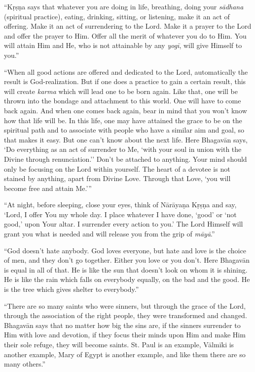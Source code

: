 \documentclass[12pt, twoside, openright]{memoir}
\begin{document}
\enquote{Kṛṣṇa says that whatever you are doing in life, breathing, doing your \textit{sādhana} (spiritual practice), eating, drinking, sitting, or listening, make it an act of offering. Make it an act of surrendering to the Lord. Make it a prayer to the Lord and offer the prayer to Him. Offer all the merit of whatever you do to Him. You will attain Him and He, who is not attainable by any \textit{yogī}, will give Himself to you.}

\enquote{When all good actions are offered and dedicated to the Lord, automatically the result is God-realization. But if one does a practice to gain a certain result, this will create \textit{karma} which will lead one to be born again. Like that, one will be thrown into the bondage and attachment to this world. One will have to come back again. And when one comes back again, bear in mind that you won’t know how that life will be. In this life, one may have attained the grace to be on the spiritual path and to associate with people who have a similar aim and goal, so that makes it easy. But one can’t know about the next life. Here Bhagavān says, \enquote{Do everything as an act of surrender to Me, ‘with your soul in union with the Divine through renunciation.’} Don’t be attached to anything. Your mind should only be focusing on the Lord within yourself. The heart of a devotee is not stained by anything, apart from Divine Love. Through that Love, \enquote{you will become free and attain Me.}}

\enquote{At night, before sleeping, close your eyes, think of Nārāyaṇa Kṛṣṇa and say, \enquote{Lord, I offer You my whole day. I place whatever I have done, ‘good’ or ‘not good,’ upon Your altar. I surrender every action to you.} The Lord Himself will grant you what is needed and will release you from the grip of \textit{māyā}.}

\enquote{God doesn’t hate anybody. God loves everyone, but hate and love is the choice of men, and they don’t go together. Either you love or you don’t. Here Bhagavān is equal in all of that. He is like the sun that doesn’t look on whom it is shining. He is like the rain which falls on everybody equally, on the bad and the good. He is the tree which gives shelter to everybody.}

\enquote{There are so many saints who were sinners, but through the grace of the Lord, through the association of the right people, they were transformed and changed. Bhagavān says that no matter how big the sins are, if the sinners surrender to Him with love and devotion, if they focus their minds upon Him and make Him their sole refuge, they will become saints. St. Paul is an example, Vālmīki is another example, Mary of Egypt is another example, and like them there are so many others.}
\end{document}

